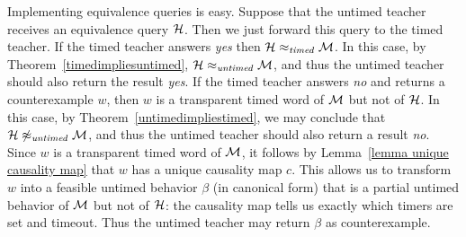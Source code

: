Implementing equivalence queries is easy.
Suppose that the untimed teacher receives an equivalence query ${\mathcal H}$.
Then we just forward this query to the timed teacher.
If the timed teacher answers \emph{yes} then ${\mathcal H} \approx_{\mathit{timed}} {\mathcal M}$.
In this case, by Theorem~\ref{timedimpliesuntimed}, ${\mathcal H} \approx_{\mathit{untimed}} {\mathcal M}$,
and thus the untimed teacher should also return the result \emph{yes}.
If the timed teacher answers \emph{no} and returns a counterexample $w$,
then $w$ is a transparent timed word of ${\mathcal M}$ but not of ${\mathcal H}$.
In this case, by Theorem~\ref{untimedimpliestimed}, we may conclude that
${\mathcal H} \not\approx_{\mathit{untimed}} {\mathcal M}$, and thus the untimed teacher should also return a result \emph{no}.
Since $w$ is a transparent timed word of ${\mathcal M}$, it 
follows by Lemma~\ref{lemma unique causality map} that $w$ 
has a unique causality map $c$.
This allows us to transform $w$ into a feasible untimed behavior $\beta$ (in canonical form) that is a partial untimed
behavior of ${\mathcal M}$ but not of ${\mathcal H}$: the causality map tells us exactly which timers are set and timeout. 
Thus the untimed teacher may return $\beta$ as counterexample.






